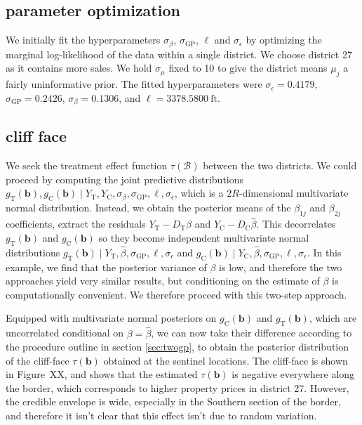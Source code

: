 \documentclass[letter]{article}
\newcommand{\treat}{\mathrm{T}}
\newcommand{\ctrol}{\mathrm{C}}
\newcommand{\sigmaf}{\sigma_{\mathrm{GP}}}
\newcommand{\sigman}{\sigma_{\epsilon}}
\newcommand{\boundary}{\mathcal{B}}
\newcommand{\sentinels}{\bm{b}}
\newcommand{\numsent}{R}
\begin{document}
    	\subsection{parameter optimization}\label{parameter-optimization}

We initially fit the hyperparameters \(\sigma_\beta\), \(\sigmaf\), \(\ell\) and \(\sigman\) by optimizing the marginal log-likelihood of the data within a single district. We choose district 27 as it contains more sales. We hold \(\sigma_\mu\) fixed to 10 to give the district means \(\mu_j\) a fairly uninformative prior. The fitted hyperparameters were \(\sigman=0.4179\), \(\sigmaf=0.2426\), \(\sigma_\beta=0.1306\), and \(\ell=3378.5800~\text{ft}\).
    


    	\subsection{cliff face}\label{cliff-face}

We seek the treatment effect function \(\tau(\boundary)\) between the two districts. We could proceed by computing the joint predictive distributions \(g_\treat{}(\sentinels),g_\ctrol{}(\sentinels) \mid Y_\treat{}, Y_\ctrol{}, \sigma_\beta,\sigmaf,\ell,\sigman\), which is a \(2 \numsent\)-dimensional multivariate normal distribution. Instead, we obtain the posterior means of the \(\beta_{1j}\) and \(\beta_{2j}\) coefficients, extract the residuals \(Y_\treat{}-D_\treat{} \hat{\beta}\) and \(Y_\ctrol{}-D_\ctrol{} \hat{\beta}\). This decorrelates \(g_\treat{}(\sentinels)\) and \(g_\ctrol{}(\sentinels)\) so they become independent multivariate normal distributions \(g_\treat{}(\sentinels) \mid Y_\treat{}, \hat\beta, \sigmaf,\ell,\sigman\) and \(g_\ctrol{}(\sentinels) \mid Y_\ctrol{}, \hat\beta, \sigmaf,\ell,\sigman\). In this example, we find that the posterior variance of \(\beta\) is low, and therefore the two approaches yield very similar results, but conditioning on the estimate of \(\beta\) is computationally convenient. We therefore proceed with this two-step approach.

Equipped with multivariate normal posteriors on \(g_\ctrol{}(\sentinels)\) and \(g_\treat{}(\sentinels)\), which are uncorrelated conditional on \(\beta=\hat\beta\), we can now take their difference according to the procedure outline in section \ref{sec:twogp}, to obtain the posterior distribution of the cliff-face \(\tau(\sentinels)\) obtained at the sentinel locations.
The cliff-face is shown in Figure~XX, and shows that the estimated \(\tau(\sentinels)\) is negative everywhere along the border, which corresponds to higher property prices in district 27.
However, the credible envelope is wide, especially in the Southern section of the border, and therefore it isn't clear that this effect isn't due to random variation.
\end{document}
